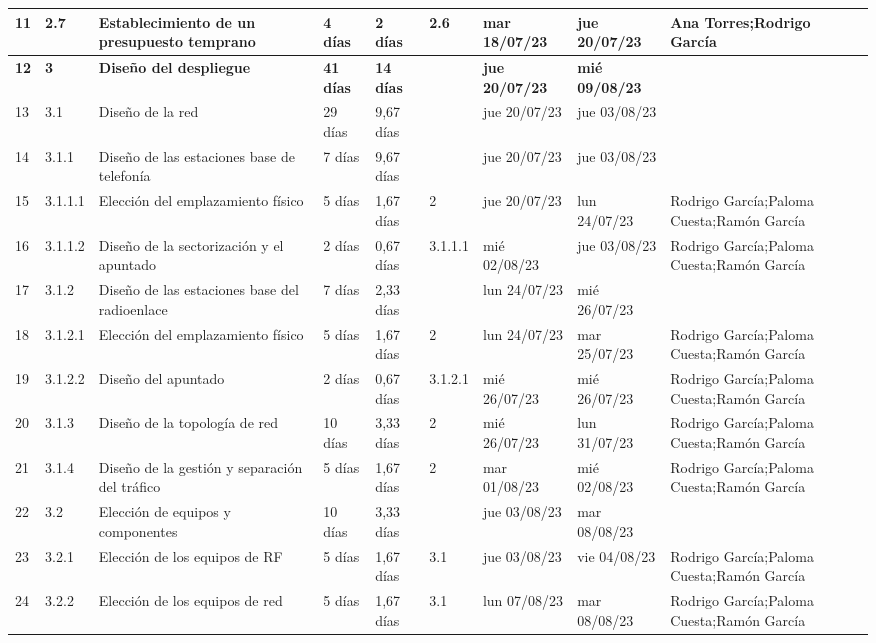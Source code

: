 \begin{landscape}
\begin{table}[p]
\begin{tabular}{|l|l|p{5.5cm}|l|l|l|l|l|p{5.5cm}|}
    11 & 2.7 & Establecimiento de un presupuesto temprano & 4 días & 2 días & 2.6 & mar 18/07/23 & jue 20/07/23 & Ana Torres;Rodrigo García \\ \hline
    \textbf{12} & \textbf{3} & \textbf{Diseño del despliegue} & \textbf{41 días} & \textbf{14 días} & \textbf{} & \textbf{jue 20/07/23} & \textbf{mié 09/08/23} & \textbf{} \\ \hline
    13 & 3.1 & Diseño de la red & 29 días & 9,67 días &  & jue 20/07/23 & jue 03/08/23 &  \\ \hline
    14 & 3.1.1 & Diseño de las estaciones base de telefonía & 7 días & 9,67 días &  & jue 20/07/23 & jue 03/08/23 &  \\ \hline
    15 & 3.1.1.1 & Elección del emplazamiento físico & 5 días & 1,67 días & 2 & jue 20/07/23 & lun 24/07/23 & Rodrigo García;Paloma Cuesta;Ramón García \\ \hline
    16 & 3.1.1.2 & Diseño de la sectorización y el apuntado & 2 días & 0,67 días & 3.1.1.1 & mié 02/08/23 & jue 03/08/23 & Rodrigo García;Paloma Cuesta;Ramón García \\ \hline
    17 & 3.1.2 & Diseño de las estaciones base del radioenlace & 7 días & 2,33 días &  & lun 24/07/23 & mié 26/07/23 &  \\ \hline
    18 & 3.1.2.1 & Elección del emplazamiento físico & 5 días & 1,67 días & 2 & lun 24/07/23 & mar 25/07/23 & Rodrigo García;Paloma Cuesta;Ramón García \\ \hline
    19 & 3.1.2.2 & Diseño del apuntado & 2 días & 0,67 días & 3.1.2.1 & mié 26/07/23 & mié 26/07/23 & Rodrigo García;Paloma Cuesta;Ramón García \\ \hline
    20 & 3.1.3 & Diseño de la topología de red & 10 días & 3,33 días & 2 & mié 26/07/23 & lun 31/07/23 & Rodrigo García;Paloma Cuesta;Ramón García \\ \hline
    21 & 3.1.4 & Diseño de la gestión y separación del tráfico & 5 días & 1,67 días & 2 & mar 01/08/23 & mié 02/08/23 & Rodrigo García;Paloma Cuesta;Ramón García \\ \hline
    22 & 3.2 & Elección de equipos y componentes & 10 días & 3,33 días &  & jue 03/08/23 & mar 08/08/23 &  \\ \hline
    23 & 3.2.1 & Elección de los equipos de RF & 5 días & 1,67 días & 3.1 & jue 03/08/23 & vie 04/08/23 & Rodrigo García;Paloma Cuesta;Ramón García \\ \hline
    24 & 3.2.2 & Elección de los equipos de red & 5 días & 1,67 días & 3.1 & lun 07/08/23 & mar 08/08/23 & Rodrigo García;Paloma Cuesta;Ramón García \\ \hline

\end{tabular}
\end{table}
\end{landscape}
